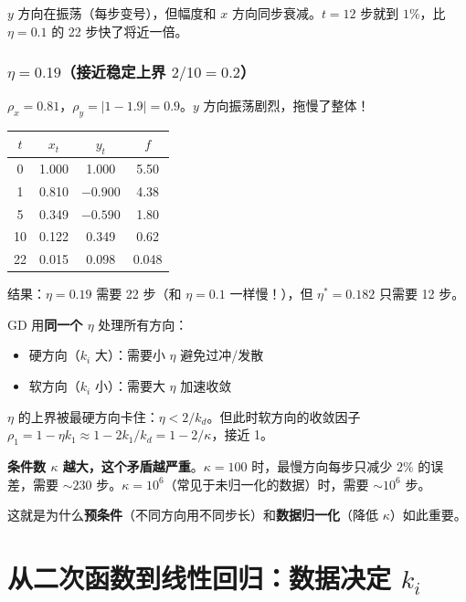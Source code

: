 \documentclass[12pt, a4paper]{ctexart}
\begin{document}
$y$ 方向在振荡（每步变号），但幅度和 $x$ 方向同步衰减。$t=12$ 步就到 $1\%$，比 $\eta = 0.1$ 的 22 步快了将近一倍。

\subsubsection{$\eta = 0.19$（接近稳定上界 $2/10 = 0.2$）}

$\rho_x = 0.81$，$\rho_y = |1 - 1.9| = 0.9$。$y$ 方向振荡剧烈，拖慢了整体！

\begin{center}
\begin{tabular}{c|cc|c}
$t$ & $x_t$ & $y_t$ & $f$ \\
\hline
0 & 1.000 & 1.000 & 5.50 \\
1 & 0.810 & $-0.900$ & 4.38 \\
5 & 0.349 & $-0.590$ & 1.80 \\
10 & 0.122 & 0.349 & 0.62 \\
22 & 0.015 & 0.098 & 0.048 \\
\end{tabular}
\end{center}

结果：$\eta = 0.19$ 需要 22 步（和 $\eta = 0.1$ 一样慢！），但 $\eta^* = 0.182$ 只需要 12 步。

\begin{insight}[GD 收敛的核心矛盾]
GD 用\textbf{同一个 $\eta$} 处理所有方向：
\begin{itemize}
    \item 硬方向（$k_i$ 大）：需要小 $\eta$ 避免过冲/发散
    \item 软方向（$k_i$ 小）：需要大 $\eta$ 加速收敛
\end{itemize}

$\eta$ 的上界被最硬方向卡住：$\eta < 2/k_d$。但此时软方向的收敛因子 $\rho_1 = 1 - \eta k_1 \approx 1 - 2k_1/k_d = 1 - 2/\kappa$，接近 1。

\textbf{条件数 $\kappa$ 越大，这个矛盾越严重}。$\kappa = 100$ 时，最慢方向每步只减少 $2\%$ 的误差，需要 $\sim 230$ 步。$\kappa = 10^6$（常见于未归一化的数据）时，需要 $\sim 10^6$ 步。

这就是为什么\textbf{预条件}（不同方向用不同步长）和\textbf{数据归一化}（降低 $\kappa$）如此重要。
\end{insight}


\section{从二次函数到线性回归：数据决定 $k_i$}
\end{document}

